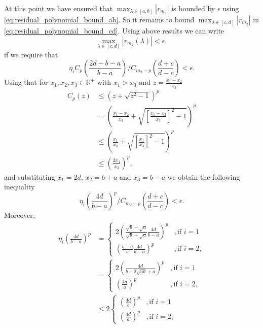 At this point we have ensured that $\max_{\lambda \in [a,b]}|r_{m_2}|$ is bounded by $\epsilon$ using \cref{eq:residual_polynomial_bound_ab}. So it remains to bound $\max_{\lambda \in [c,d]}|r_{m_2}|$ in \cref{eq:residual_polynomial_bound_cd}. Using above results we can write 
\begin{equation*}
    \max_{\lambda \in [c,d]} |r_{m_2}(\lambda)| < \epsilon,
\end{equation*}
if we require that
\begin{equation}
    \eta_i C_{p}\left(\frac{2d - b - a}{b - a}\right) /C_{m_2-p}\left(\frac{d+c}{d-c}\right) < \epsilon.
    \label{eq:relative_error_bound_mp}
\end{equation}
Using that for $x_1, x_2, x_3 \in \mathbb{R}^+$ with $x_1 > x_3$ and $z = \frac{x_1 - x_2}{x_3}$
\begin{align*}
    C_p(z) & \leq \left(z + \sqrt{z^2 - 1}\right)^p \\
    & = \left( \frac{x_1 - x_2}{x_3} + \sqrt{ \left[\frac{x_1 - x_2}{x_3}\right]^2 -1}\right)^p \\
    & \leq \left( \frac{x_1}{x_3} + \sqrt{ \left[\frac{x_1}{x_3}\right]^2 - 1}\right)^p \\
    & \leq \left( \frac{2x_1}{x_3}\right)^p,
\end{align*}
and substituting $x_1 = 2d$, $x_2 = b + a$ and $x_3 = b - a$ we obtain the following inequality
\begin{equation}
    \eta_i \left(\frac{4d}{b-a} \right)^p /C_{m_2-p}\left(\frac{d+c}{d-c}\right) < \epsilon. 
    \label{eq:chebyshev_degree_p_bound}
\end{equation}
Moreover,
\begin{align*}
    \eta_i \left(\frac{4d}{b-a}\right)^p &= 
    \begin{cases}
        2\left(\frac{\sqrt{b} - \sqrt{a}}{\sqrt{b} + \sqrt{a}} \frac{4d}{b-a}\right)^p &, \text{if } i = 1\\
        \left(\frac{b - a}{a}\frac{4d}{b-a}\right)^p &, \text{if } i = 2,
    \end{cases}\\
    &=
    \begin{cases}
        2\left(\frac{4d}{b + 2\sqrt{ab} + a}\right)^p &, \text{if } i = 1\\
        \left(\frac{4d}{a}\right)^p &, \text{if } i = 2,
    \end{cases}\\
    &\leq 2
    \begin{cases}
        \left(\frac{4d}{b}\right)^p &, \text{if } i = 1\\
        \left(\frac{4d}{a}\right)^p &, \text{if } i = 2,
    \end{cases}
\end{align*}
